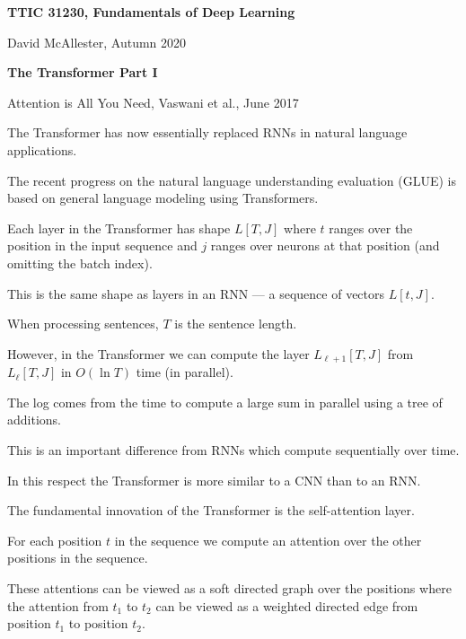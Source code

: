 





{\Huge
  \centerline{\bf TTIC 31230,  Fundamentals of Deep Learning}
  \vfill
  \centerline{David McAllester, Autumn 2020}
  \vfill
  \centerline{\bf  The Transformer Part I}
  \vfill
  \vfill


Attention is All You Need, Vaswani et al., June 2017

\vfill
The Transformer has now essentially replaced RNNs in natural language applications.

\vfill

The recent progress on the natural language understanding evaluation (GLUE) is based on general language modeling using Transformers.


\vfill
Each layer in the Transformer has shape $L[T,J]$ where $t$ ranges over the position in the input sequence and $j$ ranges over neurons at that position
(and omitting the batch index).

\vfill
This is the same shape as layers in an RNN --- a sequence of vectors $L[t,J]$.

\vfill
When processing sentences, $T$ is the sentence length.


However, in the Transformer we can compute the layer $L_{\ell+1}[T,J]$ from $L_\ell[T,J]$ in $O(\ln T)$ time (in parallel).

\vfill
The log comes from the time to compute a large sum in parallel using a tree of additions.

\vfill
This is an important difference from RNNs which compute sequentially over time.

\vfill
In this respect the Transformer is more similar to a CNN than to an RNN.


The fundamental innovation of the Transformer is the self-attention layer.

\vfill
For each position $t$ in the sequence we compute an attention over the other positions in the sequence.

\vfill
These attentions can be viewed as a soft directed graph over the positions where
the attention from $t_1$ to $t_2$ can be viewed as a weighted directed edge from position $t_1$ to position $t_2$.

}
